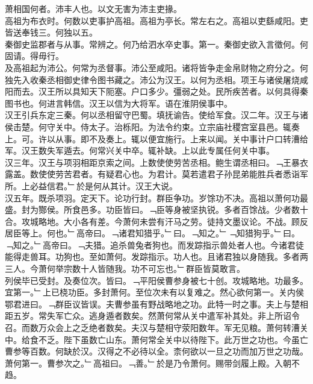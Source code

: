 \documentclass{zhvt-classic}
\begin{document}

\hspace*{2em}萧相国何者。沛丰人也。以文无害为沛主吏掾。\\
\hspace*{2em}高祖为布衣时。何数以吏事护高祖。高祖为亭长。常左右之。高祖以吏繇咸阳。吏皆送奉钱三。何独以五。\\
\hspace*{2em}秦御史监郡者与从事。常辨之。何乃给泗水卒史事。第一。秦御史欲入言徵何。何固请。得毋行。\\
\hspace*{2em}及高祖起为沛公。何常为丞督事。沛公至咸阳。诸将皆争走金帛财物之府分之。何独先入收秦丞相御史律令图书藏之。沛公为汉王。以何为丞相。项王与诸侯屠烧咸阳而去。汉王所以具知天下阨塞。户口多少。彊弱之处。民所疾苦者。以何具得秦图书也。何进言韩信。汉王以信为大将军。语在淮阴侯事中。\\
\hspace*{2em}汉王引兵东定三秦。何以丞相留守巴蜀。填抚谕告。使给军食。汉二年。汉王与诸侯击楚。何守关中。侍太子。治栎阳。为法令约束。立宗庙社稷宫室县邑。辄奏上。可。许以从事。即不及奏上。辄以便宜施行。上来以闻。关中事计户口转漕给军。汉王数失军遁去。何常兴关中卒。辄补缺。上以此专属任何关中事。\\
\hspace*{2em}汉三年。汉王与项羽相距京索之间。上数使使劳苦丞相。鲍生谓丞相曰。﹁王暴衣露盖。数使使劳苦君者。有疑君心也。为君计。莫若遣君子孙昆弟能胜兵者悉诣军所。上必益信君。﹂於是何从其计。汉王大说。\\
\hspace*{2em}汉五年。既杀项羽。定天下。论功行封。群臣争功。岁馀功不决。高祖以萧何功最盛。封为酂侯。所食邑多。功臣皆曰。﹁臣等身被坚执锐。多者百馀战。少者数十合。攻城略地。大小各有差。今萧何未尝有汗马之劳。徒持文墨议论。不战。顾反居臣等上。何也。﹂高帝曰。﹁诸君知猎乎。﹂曰。﹁知之。﹂﹁知猎狗乎。﹂曰。﹁知之。﹂高帝曰。﹁夫猎。追杀兽兔者狗也。而发踪指示兽处者人也。今诸君徒能得走兽耳。功狗也。至如萧何。发踪指示。功人也。且诸君独以身随我。多者两三人。今萧何举宗数十人皆随我。功不可忘也。﹂群臣皆莫敢言。\\
\hspace*{2em}列侯毕已受封。及奏位次。皆曰。﹁平阳侯曹参身被七十创。攻城略地。功最多。宜第一。﹂上已桡功臣。多封萧何。至位次未有以复难之。然心欲何第一。关内侯鄂君进曰。﹁群臣议皆误。夫曹参虽有野战略地之功。此特一时之事。夫上与楚相距五岁。常失军亡众。逃身遁者数矣。然萧何常从关中遣军补其处。非上所诏令召。而数万众会上之乏绝者数矣。夫汉与楚相守荥阳数年。军无见粮。萧何转漕关中。给食不乏。陛下虽数亡山东。萧何常全关中以待陛下。此万世之功也。今虽亡曹参等百数。何缺於汉。汉得之不必待以全。柰何欲以一旦之功而加万世之功哉。萧何第一。曹参次之。﹂高祖曰。﹁善。﹂於是乃令萧何。赐带剑履上殿。入朝不趋。\\
\end{document}
